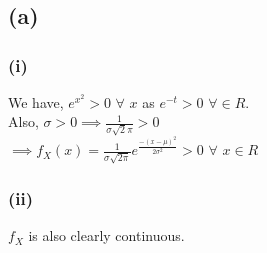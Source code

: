 \documentclass[a4paper,fleqn,11pt]{article}
\theoremstyle{mytheor}
\begin{document}
\section{}
\subsection{(a)}
\subsubsection*{(i)}
We have, $e^{x^2} > 0$ $\forall$ $x$ as $e^{-t} > 0$ $\forall \in \!R$. \\
Also, $\sigma > 0 \implies \frac{1}{\sigma \sqrt{2} \pi} > 0$ \\
$\implies f_{X}(x) = \frac{1}{\sigma \sqrt{2\pi}} e^{\frac{-(x - \mu)^2}{2 \sigma^2}} > 0$ $\forall$ $x \in \!R$
\subsubsection*{(ii)}
$f_{X}$ is also clearly continuous.
\end{document}
